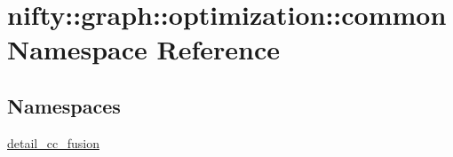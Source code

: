 \hypertarget{namespacenifty_1_1graph_1_1optimization_1_1common}{}\section{nifty\+:\+:graph\+:\+:optimization\+:\+:common Namespace Reference}
\label{namespacenifty_1_1graph_1_1optimization_1_1common}
\subsection*{Namespaces}
\begin{DoxyCompactItemize}
\item 
 \hyperlink{namespacenifty_1_1graph_1_1optimization_1_1common_1_1detail__cc__fusion}{detail\+\_\+cc\+\_\+fusion}
\end{DoxyCompactItemize}
